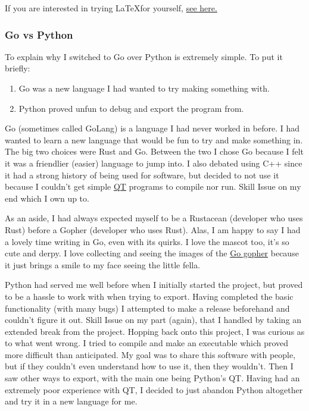 If you are interested in trying \LaTeX for yourself,
\href{https://www.latex-project.org/get/}{see here.}

\subsubsection{Go vs Python}

To explain why I switched to Go over Python is extremely simple.
To put it briefly:
\begin{enumerate}
	\item Go was a new language I had wanted to try making something with.
	\item Python proved unfun to debug and export the program from.
\end{enumerate}

Go (sometimes called GoLang) is a language I had never worked in
before. I had wanted to
learn a new language that would be fun to try and make something
in. The big two choices were Rust and Go. Between the two I chose Go because
I felt it was a friendlier (easier) language to jump into. I also
debated using C++ since it had a strong history of being used for
software, but decided to not use it because I couldn't
get simple \href{https://www.qt.io/product/framework}{QT}
programs to compile nor run. Skill Issue on my end which I own up to.

As an aside, I had always expected myself to be a Rustacean
(developer who uses Rust) before a
Gopher (developer who uses Rust). Alas, I am happy to say I had a
lovely time writing in Go,
even with its quirks. I love the mascot too, it's so cute and derpy.
I love collecting and seeing the images of the
\href{https://go.dev/blog/gopher}{Go gopher}
because it just brings a smile to my face seeing the little fella.

Python had served me well before when I initially started the
project, but proved to be a hassle to work with when trying to
export. Having completed the basic functionality (with many bugs) I
attempted to make a release beforehand and couldn't figure it out.
Skill Issue on my part (again), that I handled by taking an extended break
from the project.
Hopping back onto this project, I was curious as to what went
wrong. I tried to compile and make an executable which proved more
difficult than anticipated. My goal was to share this software with
people, but if they couldn't even understand how to use it, then
they wouldn't. Then I saw other ways to export, with the main one
being Python's QT.
Having had an extremely poor experience with QT, I decided to just
abandon Python altogether and try it in a new language for me.

